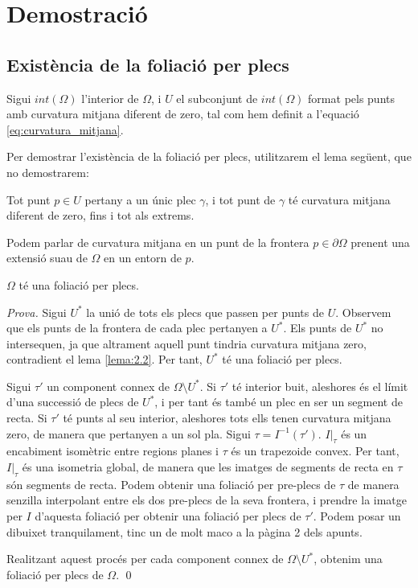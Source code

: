 \section{Demostració}
\subsection{Existència de la foliació per plecs}
Sigui $int(\Omega)$ l'interior de $\Omega$, i $U$ el subconjunt de $int(\Omega)$ format pels punts amb curvatura mitjana diferent de zero, tal com hem definit a l'equació \eqref{eq:curvatura_mitjana}.

Per demostrar l'existència de la foliació per plecs, utilitzarem el lema següent, que no demostrarem:
\begin{lema}\label{lema:2.2}
    Tot punt $p\in U$ pertany a un únic plec $\gamma$, i tot punt de $\gamma$ té curvatura mitjana diferent de zero, fins i tot als extrems.
\end{lema}
Podem parlar de curvatura mitjana en un punt de la frontera $p\in\partial \Omega$ prenent una extensió suau de $\Omega$ en un entorn de $p$.

\begin{teo}\label{teo:existencia_foliacio_plecs}
    $\Omega$ té una foliació per plecs.
\end{teo}
{
    \color{green!50!black}
    \textit{Prova.}
    Sigui $U^*$ la unió de tots els plecs que passen per punts de $U$. Observem que els punts de la frontera de cada plec pertanyen a $U^*$. Els punts de $U^*$ no intersequen, ja que altrament aquell punt tindria curvatura mitjana zero, contradient el lema \ref{lema:2.2}. Per tant, $U^*$ té una foliació per plecs. 

    Sigui $\tau'$ un component connex de $\Omega\setminus U^*$.
    Si $\tau'$ té interior buit, aleshores és el límit d'una successió de plecs de $U^*$, i per tant és també un plec en ser un segment de recta.
    Si $\tau'$ té punts al seu interior, aleshores tots ells tenen curvatura mitjana zero, de manera que pertanyen a un sol pla.
    Sigui $\tau = I^{-1}(\tau')$. $I|_{\tau}$ és un encabiment isomètric entre regions planes i $\tau$ és un trapezoide convex. Per tant, $I|_{\tau}$ és una isometria global, de manera que les imatges de segments de recta en $\tau$ són segments de recta. Podem obtenir una foliació per pre-plecs de $\tau$ de manera senzilla interpolant entre els dos pre-plecs de la seva frontera, i prendre la imatge per $I$ d'aquesta foliació per obtenir una foliació per plecs de $\tau'$.{\color{blue} Podem posar un dibuixet tranquilament, tinc un de molt maco a la pàgina 2 dels apunts.}

    Realitzant aquest procés per cada component connex de $\Omega\setminus U^*$, obtenim una foliació per plecs de $\Omega$.
    \qed
}
